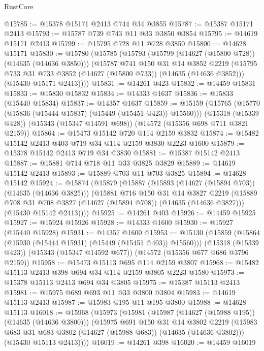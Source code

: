 \begin{lexlean}{RustCore}
\begin{coremodule}
@15785 := @15378 @15171 @2413 @744 @34 @3855
@15787 := @15387 @15171 @2413
@15793 := @15787 @739 @743 @11 @33 @3850 @3854
@15795 := @14619 @15171 @2413
@15799 := @15795 @728 @11 @728 @3850
@15800 := @14628 @15171
@15830 := @15780
    (@15785
      (@15793
        (@15799 (@14627 (@15800 @728)) (@14635 (@14636 @3850)))
        (@15787
          @741
          @150
          @31
          @14
          @3852
          @2219
          (@15795 @733 @31 @733 @3852 (@14627 (@15800 @733)) (@14635 (@14636 @3852)))
          (@15430 @15171 @2413))))
@15831 := @14261 @423
@15832 := @14459 @15831
@15833 := @15830 @15832
@15834 := @14333 @1637
@15836 := @15833 (@15440 @15834)
@15837 := @14357 @1637
@15859 := @15159
    (@15765 (@15770 (@15836 (@15444 @15837) (@15449 (@15451 @423)) @15560)))
    (@15318 (@15339 @428))
    (@15343 (@15347 @14591 @698))
    (@14572 (@15356 @698 @711 @3821 @2159))
@15864 := @15473 @15142 @720 @114 @2159 @3832
@15874 := @15482 @15142 @2413 @403 @719 @34 @114 @2159 @3830 @2223 @1600
@15879 := @15378 @15142 @2413 @719 @34 @3830
@15881 := @15387 @15142 @2413
@15887 := @15881 @714 @718 @11 @33 @3825 @3829
@15889 := @14619 @15142 @2413
@15893 := @15889 @703 @11 @703 @3825
@15894 := @14628 @15142
@15924 := @15874
    (@15879
      (@15887
        (@15893 (@14627 (@15894 @703)) (@14635 (@14636 @3825)))
        (@15881
          @716
          @150
          @31
          @14
          @3827
          @2219
          (@15889 @708 @31 @708 @3827 (@14627 (@15894 @708)) (@14635 (@14636 @3827)))
          (@15430 @15142 @2413))))
@15925 := @14261 @403
@15926 := @14459 @15925
@15927 := @15924 @15926
@15928 := @14333 @1600
@15930 := @15927 (@15440 @15928)
@15931 := @14357 @1600
@15953 := @15130
    (@15859 (@15864 (@15930 (@15444 @15931) (@15449 (@15451 @403)) @15560)))
    (@15318 (@15339 @423))
    (@15343 (@15347 @14592 @677))
    (@14572 (@15356 @677 @686 @3796 @2159))
@15958 := @15473 @15113 @695 @114 @2159 @3807
@15968 := @15482 @15113 @2413 @398 @694 @34 @114 @2159 @3805 @2223 @1580
@15973 := @15378 @15113 @2413 @694 @34 @3805
@15975 := @15387 @15113 @2413
@15981 := @15975 @689 @693 @11 @33 @3800 @3804
@15983 := @14619 @15113 @2413
@15987 := @15983 @195 @11 @195 @3800
@15988 := @14628 @15113
@16018 := @15968
    (@15973
      (@15981
        (@15987 (@14627 (@15988 @195)) (@14635 (@14636 @3800)))
        (@15975
          @691
          @150
          @31
          @14
          @3802
          @2219
          (@15983 @683 @31 @683 @3802 (@14627 (@15988 @683)) (@14635 (@14636 @3802)))
          (@15430 @15113 @2413))))
@16019 := @14261 @398
@16020 := @14459 @16019

\end{coremodule}
\end{lexlean}
